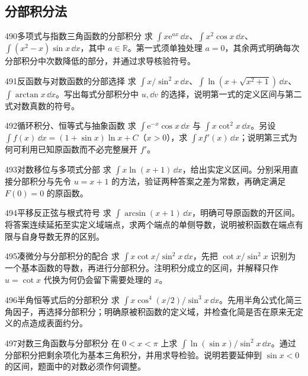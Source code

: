 \subsection{分部积分法}
\begin{exercise}{490}{多项式与指数三角函数的分部积分}
求 $\int x\mathrm e^{ax}\,\dd x$、$\int x^2\cos x\,\dd x$、$\int(x^2-x)\sin x\,\dd x$，其中 $a\in\mathbb R$。第一式须单独处理 $a=0$，其余两式明确每次分部积分中次数降低的部分，并通过求导核验符号。
\end{exercise}
\begin{exercise}{491}{反函数与对数函数的分部选择}
求 $\int x/\sin^2x\,\dd x$、$\int\ln(x+\sqrt{x^2+1})\,\dd x$、$\int\arctan x\,\dd x$。写出每式分部积分中 $u,\dd v$ 的选择，说明第一式的定义区间与第二式对数真数的符号。
\end{exercise}
\begin{exercise}{492}{循环积分、恒等式与抽象函数}
求 $\int\mathrm e^{-x}\cos x\,\dd x$ 与 $\int x\cot^2x\,\dd x$。另设 $\int f(x)\,\dd x=(1+\sin x)\ln x+C$（$x>0$），求 $\int xf'(x)\,\dd x$；说明第三式为何可利用已知原函数而不必完整展开 $f'$。
\end{exercise}
\begin{exercise}{493}{对数移位与多项式分部}
求 $\int x\ln(x+1)\,\dd x$，给出实定义区间。分别采用直接分部积分与先令 $u=x+1$ 的方法，验证两种答案之差为常数，再确定满足 $F(0)=0$ 的原函数。
\end{exercise}
\begin{exercise}{494}{平移反正弦与根式符号}
求 $\int\arcsin(x+1)\,\dd x$，明确可导原函数的开区间。将答案连续延拓至实定义域端点，求两个端点的单侧导数，说明被积函数在端点有限与自身导数无界的区别。
\end{exercise}
\begin{exercise}{495}{凑微分与分部积分的配合}
求 $\int x\cot x/\sin^2x\,\dd x$，先把 $\cot x/\sin^2x$ 识别为一个基本函数的导数，再进行分部积分。注明积分成立的区间，并解释只作 $u=\cot x$ 代换为何仍会留下需要处理的 $x$。
\end{exercise}
\begin{exercise}{496}{半角恒等式后的分部积分}
求 $\int x\cos^4(x/2)/\sin^3x\,\dd x$。先用半角公式化简三角因子，再选择分部积分；明确原被积函数的定义域，并检查化简是否在原来无定义的点造成表面约分。
\end{exercise}
\begin{exercise}{497}{对数三角函数与分部积分}
在 $0<x<\pi$ 上求 $\int\ln(\sin x)/\sin^2x\,\dd x$。通过分部积分把剩余项化为基本三角积分，并用求导检验。说明若要延伸到 $\sin x<0$ 的区间，题面中的对数必须作何调整。
\end{exercise}
